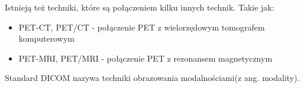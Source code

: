 Istnieją też techniki, które są połączeniem kilku innych technik.
Takie jak:
\begin{itemize}
    \item PET-CT, PET/CT - połączenie PET z wielorzędowym tomografem komputerowym
    \item PET-MRI, PET/MRI - połączenie PET z rezonansem magnetycznym
\end{itemize}

Standard DICOM nazywa techniki obrazowania modalnościami(z ang. modality).